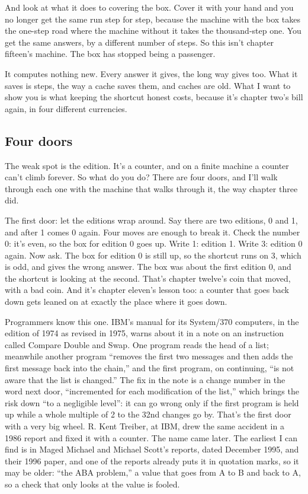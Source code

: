 \documentclass[11pt,twoside]{article}
\theoremstyle{thielethm}
\theoremstyle{thieledef}
\theoremstyle{thieledef}
\theoremstyle{thieledef}
\theoremstyle{thielethm}
\theoremstyle{thieleobs}
\theoremstyle{thielethm}
\begin{document}
And look at what it does to covering the box. Cover it with your hand and you no longer get the same run step for step, because the machine with the box takes the one-step road where the machine without it takes the thousand-step one. You get the same answers, by a different number of steps. So this isn't chapter fifteen's machine. The box has stopped being a passenger.

It computes nothing new. Every answer it gives, the long way gives too. What it saves is steps, the way a cache saves them, and caches are old. What I want to show you is what keeping the shortcut honest costs, because it's chapter two's bill again, in four different currencies.

\subsection{Four doors}

The weak spot is the edition. It's a counter, and on a finite machine a counter can't climb forever. So what do you do? There are four doors, and I'll walk through each one with the machine that walks through it, the way chapter three did.

The first door: let the editions wrap around. Say there are two editions, 0 and 1, and after 1 comes 0 again. Four moves are enough to break it. Check the number 0: it's even, so the box for edition 0 goes up. Write 1: edition 1. Write 3: edition 0 again. Now ask. The box for edition 0 is still up, so the shortcut runs on 3, which is odd, and gives the wrong answer. The box was about the first edition 0, and the shortcut is looking at the second. That's chapter twelve's coin that moved, with a bad coin. And it's chapter eleven's lesson too: a counter that goes back down gets leaned on at exactly the place where it goes down.

Programmers know this one. IBM's manual for its System/370 computers, in the edition of 1974 as revised in 1975, warns about it in a note on an instruction called Compare Double and Swap. One program reads the head of a list; meanwhile another program ``removes the first two messages and then adds the first message back into the chain,'' and the first program, on continuing, ``is not aware that the list is changed.'' The fix in the note is a change number in the word next door, ``incremented for each modification of the list,'' which brings the risk down ``to a negligible level'': it can go wrong only if the first program is held up while a whole multiple of 2 to the 32nd changes go by. That's the first door with a very big wheel. R. Kent Treiber, at IBM, drew the same accident in a 1986 report and fixed it with a counter. The name came later. The earliest I can find is in Maged Michael and Michael Scott's reports, dated December 1995, and their 1996 paper, and one of the reports already puts it in quotation marks, so it may be older: ``the ABA problem,'' a value that goes from A to B and back to A, so a check that only looks at the value is fooled.
\end{document}
